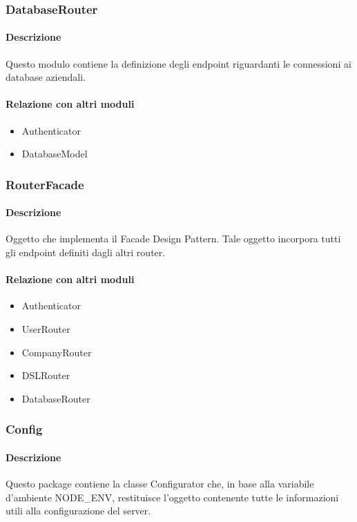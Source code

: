 \subsubsection{DatabaseRouter}
\paragraph*{Descrizione}
Questo modulo contiene la definizione degli endpoint riguardanti le connessioni ai database aziendali.

\paragraph*{Relazione con altri moduli}
\begin{itemize}
\item Authenticator
\item DatabaseModel
\end{itemize}

\subsubsection{RouterFacade}
\paragraph*{Descrizione}
Oggetto che implementa il Facade Design Pattern. Tale oggetto incorpora tutti gli endpoint definiti dagli altri router.

\paragraph*{Relazione con altri moduli}
\begin{itemize}
\item Authenticator
\item UserRouter
\item CompanyRouter
\item DSLRouter
\item DatabaseRouter
\end{itemize}

\subsubsection{Config}
\paragraph*{Descrizione}
Questo package contiene la classe Configurator che, in base alla variabile d'ambiente NODE_ENV, restituisce l'oggetto contenente tutte le informazioni utili alla configurazione del server.

